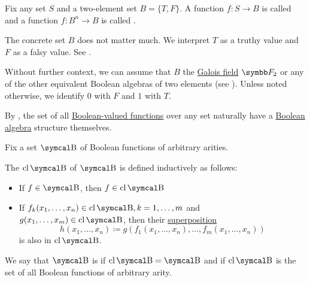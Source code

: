 \begin{definition}\label{def:boolean_function}
  Fix any set \( S \) and a two-element set \( B = \{ T, F \} \). A function \( f: S \to B \) is called  and a function \( f: B^n \to B \) is called .

  The concrete set \( B \) does not matter much. We interpret \( T \) as a truthy value and \( F \) as a falsy value. See .

  Without further context, we can assume that \( B \) the \hyperref[thm:galois_field_existence]{Galois field} \( \BF_2 \) or any of the other equivalent Boolean algebras of two elements (see ). Unless noted otherwise, we identify \( 0 \) with \( F \) and \( 1 \) with \( T \).
\end{definition}

\begin{remark}\label{def:boolean_functions_form_boolean_algebra}
  By , the set of all \hyperref[def:boolean_function]{Boolean-valued functions} over any set naturally have a \hyperref[def:boolean_algebra]{Boolean algebra} structure themselves.
\end{remark}

\begin{definition}\label{def:boolean_closure}
  Fix a set \( \CB \) of Boolean functions of arbitrary arities.

  The  \( \Cl{\CB} \) of \( \CB \) is defined inductively as follows:
  \begin{itemize}
    \item If \( f \in \CB \), then \( f \in \Cl{\CB} \)
    \item If \( f_k(x_1, \ldots, x_n) \in \Cl{\CB}, k = 1, \ldots, m \) and \( g(x_1, \ldots, x_m) \in \Cl{\CB} \), then their \hyperref[def:function/superposition]{superposition}
    \begin{equation*}
      h(x_1, \ldots, x_n) \coloneqq g(f_1(x_1, \ldots, x_n), \ldots, f_m(x_1, \ldots, x_n))
    \end{equation*}
    is also in \( \Cl{\CB} \).
  \end{itemize}

  We say that \( \CB \) is  if \( \Cl{\CB} = \CB \) and  if \( \Cl{\CB} \) is the set of all Boolean functions of arbitrary arity.
\end{definition}

